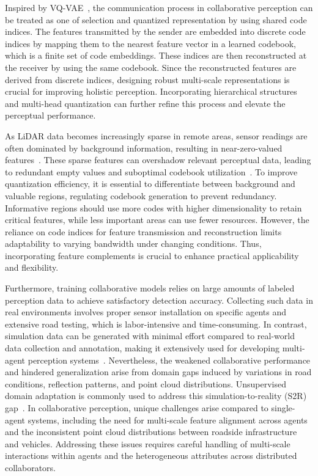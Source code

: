 \documentclass[lettersize,journal]{IEEEtran}
\begin{document}
Inspired by VQ-VAE~\cite{vqvae}, the communication process in collaborative perception can be treated as one of selection and quantized representation by using shared code indices. The features transmitted by the sender are embedded into discrete code indices by mapping them to the nearest feature vector in a learned codebook, which is a finite set of code embeddings. These indices are then reconstructed at the receiver by using the same codebook.
Since the reconstructed features are derived from discrete indices, designing robust multi-scale representations is crucial for improving holistic perception. Incorporating hierarchical structures and multi-head quantization can further refine this process and elevate the perceptual performance.

As LiDAR data becomes increasingly sparse in remote areas, sensor readings are often dominated by background information, resulting in near-zero-valued features~\cite{VoxelNeXt}. These sparse features can overshadow relevant perceptual data, leading to redundant empty values and suboptimal codebook utilization~\cite{lu2024range}.
To improve quantization efficiency, it is essential to differentiate between background and valuable regions, regulating codebook generation to prevent redundancy. Informative regions should use more codes with higher dimensionality to retain critical features, while less important areas can use fewer resources. However, the reliance on code indices for feature transmission and reconstruction limits adaptability to varying bandwidth under changing conditions. Thus, incorporating feature complements is crucial to enhance practical applicability and flexibility.

Furthermore, training collaborative models relies on large amounts of labeled perception data to achieve satisfactory detection accuracy.
Collecting such data in real environments involves proper sensor installation on specific agents and extensive road testing, which is labor-intensive and time-consuming.
In contrast, simulation data can be generated with minimal effort compared to real-world data collection and annotation, making it extensively used for developing multi-agent perception systems~\cite{Yue}.
Nevertheless, the weakened collaborative performance and hindered generalization arise from domain gaps induced by variations in road conditions, reflection patterns, and point cloud distributions.
Unsupervised domain adaptation is commonly used to address this simulation-to-reality (S2R) gap~\cite{10779389,10574400,Hoyer,10561554}. In collaborative perception, unique challenges arise compared to single-agent systems, including the need for multi-scale feature alignment across agents and the inconsistent point cloud distributions between roadside infrastructure and vehicles. Addressing these issues requires careful handling of multi-scale interactions within agents and the heterogeneous attributes across distributed collaborators.
\end{document}
